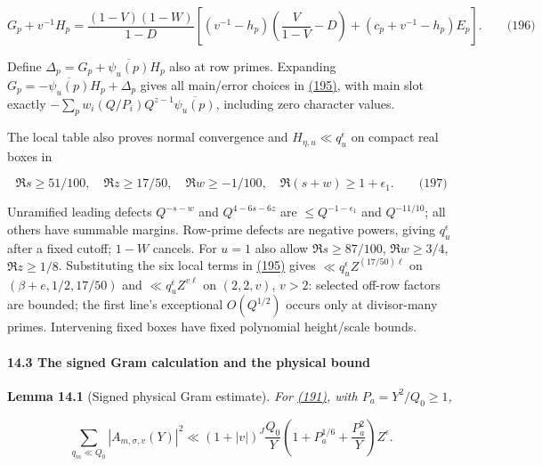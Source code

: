 \hypertarget{dr:Delta}{}

\label{dr:Delta}

\[
G_p+v^{-1}H_p=\frac{(1-V)(1-W)}{1-D}
 \left[(v^{-1}-h_p)\left(\frac V{1-V}-D\right)
 +(c_p+v^{-1}-h_p)E_p\right].\qquad\text{(196)}
\]

Define \(\Delta_p=G_p+\overline{\psi_u(p)}H_p\) also at row primes. Expanding \(G_p=-\overline{\psi_u(p)}H_p+\Delta_p\) gives all main/error choices in \protect\hyperlink{dr:Hcomp}{(195)}, with main slot exactly \(-\sum_pw_i(Q/P_i)Q^{z-1}\overline{\psi_u(p)}\), including zero character values.

The local table also proves normal convergence and \(H_{\eta,u}\ll q_u^\epsilon\) on compact real boxes in

\hypertarget{dr:box}{}

\label{dr:box}

\[
\Re s\ge51/100,\quad\Re z\ge17/50,\quad
 \Re w\ge-1/100,\quad\Re(s+w)\ge1+\epsilon_1.
 \qquad\text{(197)}
\]

Unramified leading defects \(Q^{-s-w}\) and \(Q^{4-6s-6z}\) are \(\le Q^{-1-\epsilon_1}\) and \(Q^{-11/10}\); all others have summable margins. Row-prime defects are negative powers, giving \(q_u^\epsilon\) after a fixed cutoff; \(1-W\) cancels. For \(u=1\) also allow \(\Re s\ge87/100\), \(\Re w\ge3/4\), \(\Re z\ge1/8\). Substituting the six local terms in \protect\hyperlink{dr:Hcomp}{(195)} gives \(\ll q_u^\epsilon Z^{(17/50)\ell}\) on \((\beta+e,1/2,17/50)\) and \(\ll q_u^\epsilon Z^{v\ell}\) on \((2,2,v)\), \(v>2\): selected off-row factors are bounded; the first line's exceptional \(O(Q^{1/2})\) occurs only at divisor-many primes. Intervening fixed boxes have fixed polynomial height/scale bounds.

\hypertarget{dr:Gram}{}

\label{dr:Gram}

\hypertarget{the-signed-gram-calculation-and-the-physical-bound}{%
\paragraph{14.3 The signed Gram calculation and the physical bound}\label{the-signed-gram-calculation-and-the-physical-bound}}

\textbf{Lemma 14.1} (Signed physical Gram estimate). \emph{\hypertarget{dr:Gram-lemma}{}\label{dr:Gram-lemma} For \protect\hyperlink{dr:A}{(191)}, with \(P_a=Y^2/Q_0\ge1\),}

\[
\sum_{q_m\ll Q_0}|A_{m,\sigma,v}(Y)|^2
 \ll (1+|v|)^J\frac{Q_0}{Y}
       \left(1+P_a^{1/6}+\frac{P_a^2}{Y}\right)Z^\epsilon.
\]

